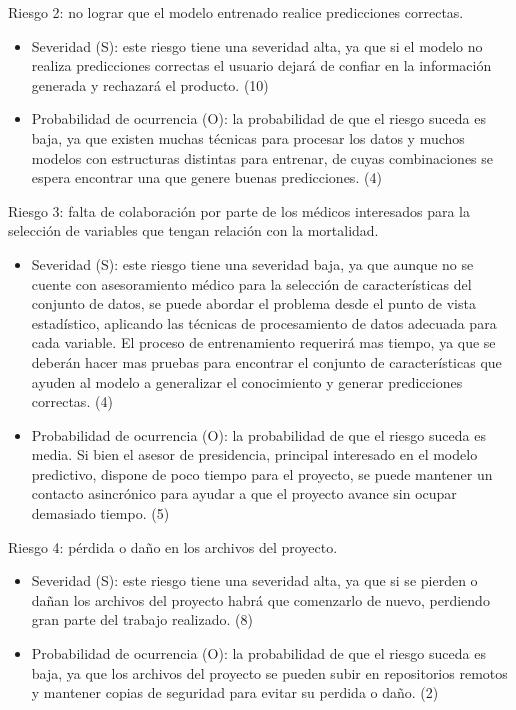 \documentclass[
11pt, %
]{charter}
\begin{document}
Riesgo 2: no lograr que el modelo entrenado realice predicciones correctas.
\begin{itemize}
	\item Severidad (S): este riesgo tiene una severidad alta, ya que si el modelo no realiza predicciones correctas el usuario dejará de confiar en la información generada y rechazará el producto. (10)
	\item Probabilidad de ocurrencia (O): la probabilidad de que el riesgo suceda es baja, ya que existen muchas técnicas para procesar los datos y muchos modelos con estructuras distintas para entrenar, de cuyas combinaciones se espera encontrar una que genere buenas predicciones. (4)
\end{itemize} 

Riesgo 3: falta de colaboración por parte de los médicos interesados para la selección de variables que tengan relación con la mortalidad.
\begin{itemize}
	\item Severidad (S): este riesgo tiene una severidad baja, ya que aunque no se cuente con asesoramiento médico para la selección de características del conjunto de datos, se puede abordar el problema desde el punto de vista estadístico, aplicando las técnicas de procesamiento de datos adecuada para cada variable. El proceso de entrenamiento requerirá mas tiempo, ya que se deberán hacer mas pruebas para encontrar el conjunto de características que ayuden al modelo a generalizar el conocimiento y generar predicciones correctas. (4)
	\item Probabilidad de ocurrencia (O): la probabilidad de que el riesgo suceda es media. Si bien el asesor de presidencia, principal interesado en el modelo predictivo, dispone de poco tiempo para el proyecto, se puede mantener un contacto asincrónico para ayudar a que el proyecto avance sin ocupar demasiado tiempo. (5)
\end{itemize} 

Riesgo 4: pérdida o daño en los archivos del proyecto.
\begin{itemize}
	\item Severidad (S): este riesgo tiene una severidad alta, ya que si se pierden o dañan los archivos del proyecto habrá que comenzarlo de nuevo, perdiendo gran parte del trabajo realizado. (8)
	\item Probabilidad de ocurrencia (O): la probabilidad de que el riesgo suceda es baja, ya que los archivos del proyecto se pueden subir en repositorios remotos y mantener copias de seguridad para evitar su perdida o daño. (2)
\end{itemize} 
\end{document}
